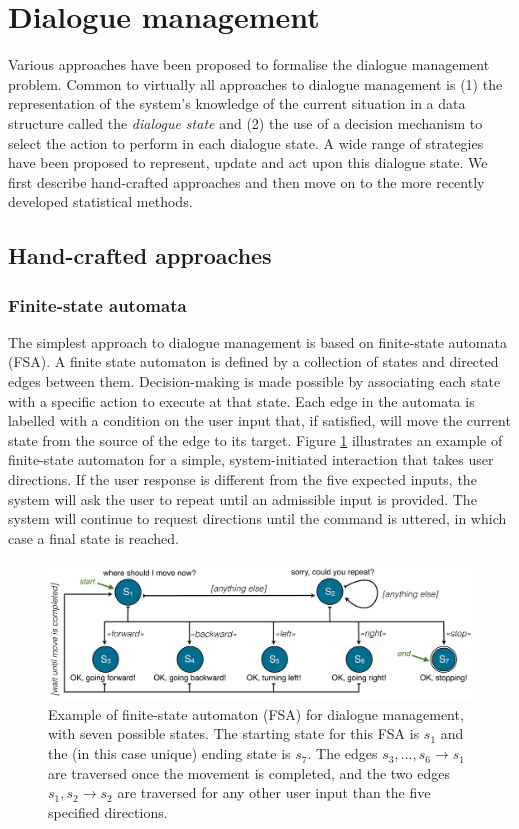 \section{Dialogue management}
\label{sec:dm}

Various approaches have been proposed to formalise the dialogue management problem.  Common to virtually all approaches to dialogue management is (1) the representation of the system's knowledge of the current situation in a data structure called the \textit{dialogue state} and (2) the use of a decision mechanism to select the action to perform in each dialogue state. A wide range of strategies have been proposed to represent, update and act upon this dialogue state.  We first describe hand-crafted approaches and then move on to the more recently developed statistical methods. 

\subsection{Hand-crafted approaches}
\label{sec:handcrafted}

\subsubsection*{Finite-state automata}

The simplest approach to dialogue management is based on finite-state automata (FSA).  A finite state automaton is defined by a collection of states and directed edges between them.  Decision-making is made possible by associating each state with a specific action to execute at that state. Each edge in the automata is labelled with a condition on the user input that, if satisfied, will move the current state from the source of the edge to its target.  Figure \ref{fig:fsa} illustrates an example of finite-state automaton for a simple, system-initiated interaction that takes user directions.  If the user response is different from the five expected inputs, the system will ask the user to repeat until an admissible input is provided.  The system will continue to request directions until the  command is uttered, in which case a final state is reached. 


\begin{figure}[h]
\centering
\includegraphics[scale=0.35]{imgs/fsa.pdf}
\caption{Example of finite-state automaton (FSA) for dialogue management, with seven possible states. The starting state for this FSA is $s_1$ and the (in this case unique) ending state is $s_7$. The edges $s_3,\dots, s_6 \rightarrow s_1$ are traversed once the movement is completed, and the two edges $s_1, s_2 \rightarrow s_2$ are traversed for any other user input than the five specified directions.}
\label{fig:fsa}
\end{figure}

